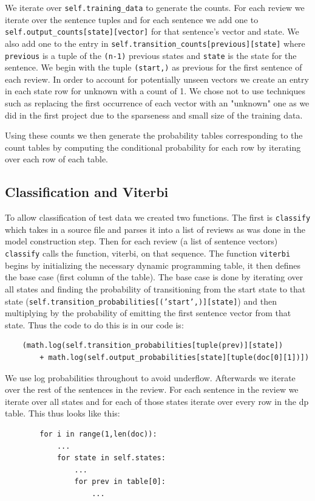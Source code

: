 \documentclass{article}
\begin{document}
We iterate over \texttt{self.training\_data} to generate the counts. For each review we iterate over the sentence tuples and for each sentence we add one to \texttt{self.output\_counts[state][vector]} for that sentence's vector and state. We also add one to the entry in  \texttt{self.transition\_counts[previous][state]} where \texttt{previous} is a tuple of the \texttt{(n-1)} previous states and \texttt{state} is the state for the sentence. We begin with the tuple \texttt{(start,)} as previous for the first sentence of each review. In order to account for potentially unseen vectors we create an entry in each state row for unknown with a count of 1. We chose not to use techniques such as replacing the first occurrence of each vector with an "unknown" one as we did in the first project due to the sparseness and small size of the training data. 

Using these counts we then generate the probability tables corresponding to the count tables by computing the conditional probability for each row by iterating over each row of each table.
 
\subsection{Classification and Viterbi}
To allow classification of test data we created two functions. The first is \texttt{classify} which takes in a source file and parses it into a list of reviews as was done in the model construction step. Then for each review (a list of sentence vectors) \texttt{classify} calls the function, viterbi, on that sequence. The function \texttt{viterbi} begins by initializing the necessary dynamic programming table, it then defines the base case (first column of the table). The base case is done by iterating over all states and finding the probability of transitioning from the start state to that state (\texttt{self.transition\_probabilities[('start',)][state]}) and then multiplying by the probability of emitting the first sentence vector from that state. Thus the code to do this is in our code is:
\begin{verbatim}
    (math.log(self.transition_probabilities[tuple(prev)][state])
        + math.log(self.output_probabilities[state][tuple(doc[0][1])])
\end{verbatim}

We use log probabilities throughout to avoid underflow. Afterwards we iterate over the rest of the sentences in the review. For each sentence in the review we iterate over all states and for each of those states iterate over every row in the dp table. This thus looks like this:
\begin{verbatim}
        for i in range(1,len(doc)):
            ...
            for state in self.states:
                ...
                for prev in table[0]:
                    ...
\end{verbatim}
\end{document}
